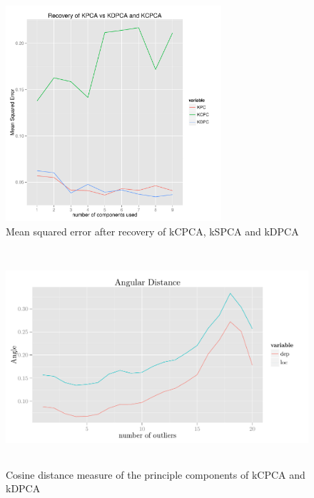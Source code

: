 \documentclass[10pt, conference, compsocconf]{IEEEtran}
\begin{document}
\clearpage

\begin{figure}[htp]
\centering
\includegraphics[height = 8cm]{simulation1}
\caption{Mean squared error after recovery of kCPCA, kSPCA and kDPCA}
\label{fig:sim1}
\end{figure}

\begin{figure}[htp]
\centering
\includegraphics[height=8cm]{simulation2plot}
\caption{Cosine distance measure of the principle components of kCPCA and kDPCA}
\label{fig:sim2}
\end{figure}
\end{document}
